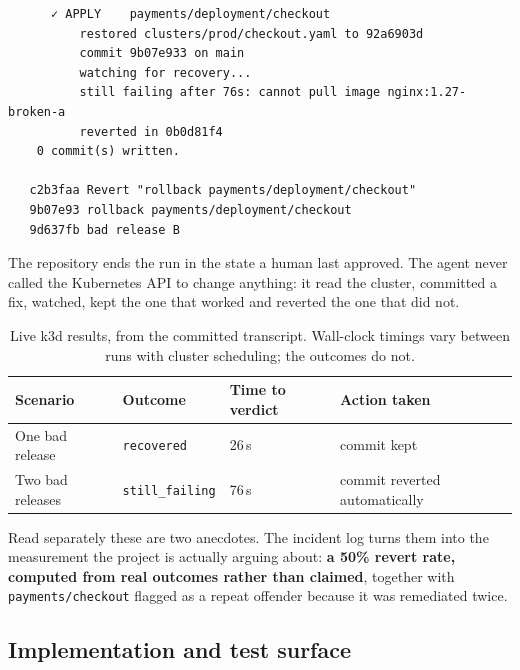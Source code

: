 \documentclass[11pt,a4paper]{article}
\newcommand{\code}[1]{\texttt{\small #1}}
\begin{document}
\begin{lstlisting}
      ✓ APPLY    payments/deployment/checkout
          restored clusters/prod/checkout.yaml to 92a6903d
          commit 9b07e933 on main
          watching for recovery...
          still failing after 76s: cannot pull image nginx:1.27-broken-a
          reverted in 0b0d81f4
    0 commit(s) written.

   c2b3faa Revert "rollback payments/deployment/checkout"
   9b07e93 rollback payments/deployment/checkout
   9d637fb bad release B
\end{lstlisting}

The repository ends the run in the state a human last approved. The agent never
called the Kubernetes API to change anything: it read the cluster, committed a
fix, watched, kept the one that worked and reverted the one that did not.

\begin{table}[h]
\centering
\small
\begin{tabularx}{\textwidth}{@{}l l l X@{}}
\toprule
\textbf{Scenario} & \textbf{Outcome} & \textbf{Time to verdict} & \textbf{Action taken} \\
\midrule
One bad release  & \code{recovered}      & 26\,s & commit kept \\
Two bad releases & \code{still\_failing} & 76\,s & commit reverted automatically \\
\bottomrule
\end{tabularx}
\caption{Live k3d results, from the committed transcript. Wall-clock timings vary
between runs with cluster scheduling; the outcomes do not.}
\end{table}

Read separately these are two anecdotes. The incident log turns them into the
measurement the project is actually arguing about: \textbf{a 50\% revert rate,
computed from real outcomes rather than claimed}, together with
\code{payments/checkout} flagged as a repeat offender because it was remediated
twice.

\subsection{Implementation and test surface}
\end{document}

